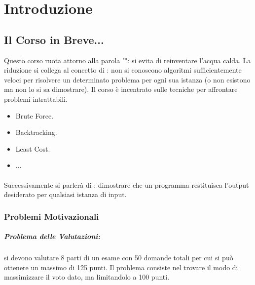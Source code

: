 \chapter{Introduzione}

\section{Il Corso in Breve...}

Questo corso ruota attorno alla parola "": si evita di reinventare l'acqua calda. La riduzione si collega al concetto di : non si conoscono algoritmi sufficientemente veloci per risolvere un determinato problema per ogni sua istanza (o non esistono ma non lo si sa dimostrare). Il corso è incentrato sulle tecniche per affrontare problemi intrattabili. 

\begin{itemize}
  \item Brute Force.
  \item Backtracking.
  \item Least Cost.
  \item ...
\end{itemize}


\subsubsection{}

Successivamente si parlerà di : dimostrare che un programma restituisca l'output desiderato per qualsiasi istanza di input.

\subsection{Problemi Motivazionali}

\paragraph{Problema delle Valutazioni:} si devono valutare 8 parti di un esame con 50 domande totali per cui si può ottenere un massimo di 125 punti. Il problema consiste nel trovare il modo di massimizzare il voto dato, ma limitandolo a 100 punti.


